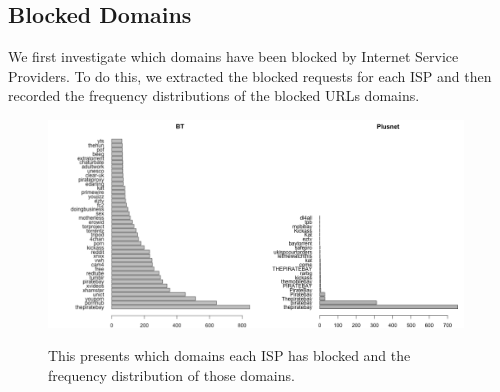 \documentclass{bmcart}
\begin{document}
\subsection*{Blocked Domains}
We first investigate which domains have been blocked by Internet Service Providers.
To do this, we extracted the blocked requests for each ISP and then recorded the frequency distributions of the blocked URLs domains.


\begin{figure}[h!]
\caption{ This presents which domains each ISP has blocked and the frequency distribution of those domains.}
\includegraphics[width=0.49\textwidth]{imgs/BT-blocked-pages-to-date}\includegraphics[width=0.49\textwidth]{imgs/Plusnet-blocked-pages-to-date}

\end{figure}
\end{document}
